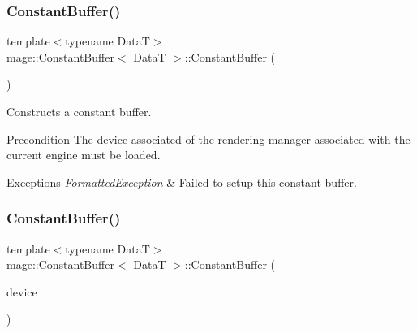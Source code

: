 \subsubsection{\texorpdfstring{Constant\+Buffer()}{ConstantBuffer()}\hspace{0.1cm}{\footnotesize\ttfamily [1/4]}}
{\footnotesize\ttfamily template$<$typename DataT$>$ \\
\hyperlink{structmage_1_1_constant_buffer}{mage\+::\+Constant\+Buffer}$<$ DataT $>$\+::\hyperlink{structmage_1_1_constant_buffer}{Constant\+Buffer} (\begin{DoxyParamCaption}{ }\end{DoxyParamCaption})}

Constructs a constant buffer.

\begin{DoxyPrecond}{Precondition}
The device associated of the rendering manager associated with the current engine must be loaded. 
\end{DoxyPrecond}

\begin{DoxyExceptions}{Exceptions}
{\em \hyperlink{classmage_1_1_formatted_exception}{Formatted\+Exception}} & Failed to setup this constant buffer. \\
\hline
\end{DoxyExceptions}
\hypertarget{structmage_1_1_constant_buffer_aaf32ac894aa2fe73bcbd9033e6e7efb0}{}\label{structmage_1_1_constant_buffer_aaf32ac894aa2fe73bcbd9033e6e7efb0} 
\subsubsection{\texorpdfstring{Constant\+Buffer()}{ConstantBuffer()}\hspace{0.1cm}{\footnotesize\ttfamily [2/4]}}
{\footnotesize\ttfamily template$<$typename DataT$>$ \\
\hyperlink{structmage_1_1_constant_buffer}{mage\+::\+Constant\+Buffer}$<$ DataT $>$\+::\hyperlink{structmage_1_1_constant_buffer}{Constant\+Buffer} (\begin{DoxyParamCaption}\item[{I\+D3\+D11\+Device5 $\ast$}]{device }\end{DoxyParamCaption})\hspace{0.3cm}{\ttfamily [explicit]}}

